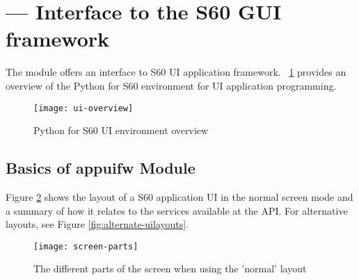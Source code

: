 %
%
%

\newlength{\screenwidth}
\setlength{\screenwidth}{0.3\textwidth}

\section{ ---
	 Interface to the S60 GUI framework}


The  module offers an interface to S60 UI application
framework. \figurename~\ref{fig:ui-overview} provides an overview of
the Python for S60 environment for UI application programming.


\begin{figure}
\centering
\texttt{[image: ui-overview]}
\caption{Python for S60 UI environment overview}
\label{fig:ui-overview}
\end{figure}

\subsection{Basics of appuifw Module}
\label{subsec:basics}
Figure \ref{fig:normal-uilayout} shows the layout of a S60 application 
UI in the normal screen mode and a summary of how it relates to the services 
available at the  API. For alternative layouts, see 
Figure \ref{fig:alternate-uilayouts}.

\begin{figure}
\centering
\texttt{[image: screen-parts]}
\caption{The different parts of the screen when using the 'normal' layout}
\label{fig:normal-uilayout}
\end{figure}

